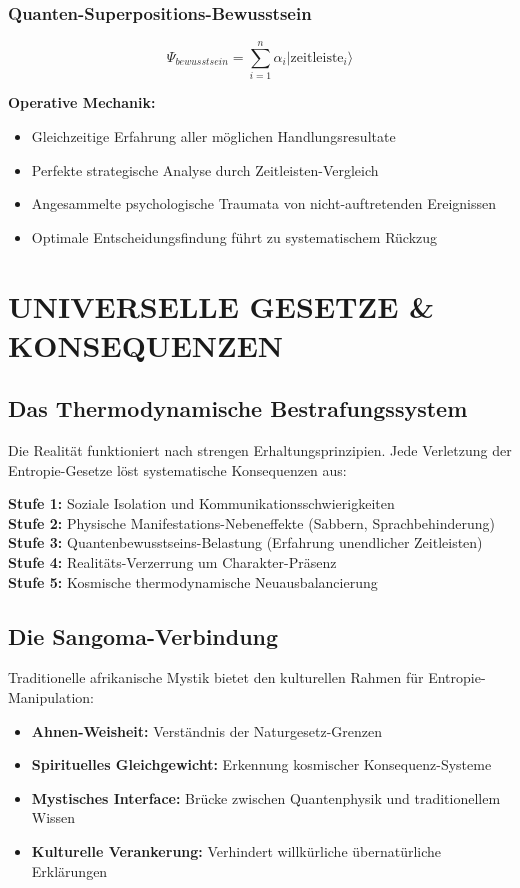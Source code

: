 \documentclass[12pt,a4paper]{article}
\begin{document}
\subsubsection{Quanten-Superpositions-Bewusstsein}
\[\Psi_{bewusstsein} = \sum_{i=1}^{n} \alpha_i |\text{zeitleiste}_i\rangle\]

\textbf{Operative Mechanik:}
\begin{itemize}
\item Gleichzeitige Erfahrung aller möglichen Handlungsresultate
\item Perfekte strategische Analyse durch Zeitleisten-Vergleich
\item Angesammelte psychologische Traumata von nicht-auftretenden Ereignissen
\item Optimale Entscheidungsfindung führt zu systematischem Rückzug
\end{itemize}

\section{UNIVERSELLE GESETZE \& KONSEQUENZEN}

\subsection{Das Thermodynamische Bestrafungssystem}
Die Realität funktioniert nach strengen Erhaltungsprinzipien. Jede Verletzung der Entropie-Gesetze löst systematische Konsequenzen aus:

\begin{tcolorbox}[colback=lightgray,colframe=darkblue,title=\textbf{Konsequenz-Hierarchie}]
\textbf{Stufe 1:} Soziale Isolation und Kommunikationsschwierigkeiten\\
\textbf{Stufe 2:} Physische Manifestations-Nebeneffekte (Sabbern, Sprachbehinderung)\\
\textbf{Stufe 3:} Quantenbewusstseins-Belastung (Erfahrung unendlicher Zeitleisten)\\
\textbf{Stufe 4:} Realitäts-Verzerrung um Charakter-Präsenz\\
\textbf{Stufe 5:} Kosmische thermodynamische Neuausbalancierung
\end{tcolorbox}

\subsection{Die Sangoma-Verbindung}
Traditionelle afrikanische Mystik bietet den kulturellen Rahmen für Entropie-Manipulation:
\begin{itemize}
\item \textbf{Ahnen-Weisheit:} Verständnis der Naturgesetz-Grenzen
\item \textbf{Spirituelles Gleichgewicht:} Erkennung kosmischer Konsequenz-Systeme
\item \textbf{Mystisches Interface:} Brücke zwischen Quantenphysik und traditionellem Wissen
\item \textbf{Kulturelle Verankerung:} Verhindert willkürliche übernatürliche Erklärungen
\end{itemize}
\end{document}
